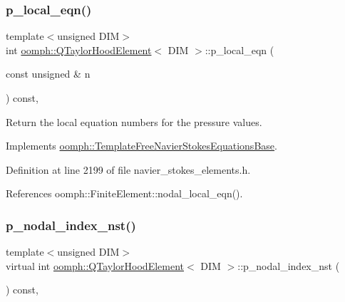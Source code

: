 \mbox{\label{classoomph_1_1QTaylorHoodElement_a13d4dd087330f26ee6283fe63153867d}} 
\subsubsection{\texorpdfstring{p\+\_\+local\+\_\+eqn()}{p\_local\_eqn()}}
{\footnotesize\ttfamily template$<$unsigned D\+IM$>$ \\
int \hyperlink{classoomph_1_1QTaylorHoodElement}{oomph\+::\+Q\+Taylor\+Hood\+Element}$<$ D\+IM $>$\+::p\+\_\+local\+\_\+eqn (\begin{DoxyParamCaption}\item[{const unsigned \&}]{n }\end{DoxyParamCaption}) const\hspace{0.3cm}{\ttfamily [inline]}, {\ttfamily [virtual]}}



Return the local equation numbers for the pressure values. 



Implements \hyperlink{classoomph_1_1TemplateFreeNavierStokesEquationsBase_a4e84f2f4260a0e65201cbb19fd63b398}{oomph\+::\+Template\+Free\+Navier\+Stokes\+Equations\+Base}.



Definition at line 2199 of file navier\+\_\+stokes\+\_\+elements.\+h.



References oomph\+::\+Finite\+Element\+::nodal\+\_\+local\+\_\+eqn().

\mbox{\label{classoomph_1_1QTaylorHoodElement_a86f85131d3383d74ab40dfdb2213d8d5}} 
\subsubsection{\texorpdfstring{p\+\_\+nodal\+\_\+index\+\_\+nst()}{p\_nodal\_index\_nst()}}
{\footnotesize\ttfamily template$<$unsigned D\+IM$>$ \\
virtual int \hyperlink{classoomph_1_1QTaylorHoodElement}{oomph\+::\+Q\+Taylor\+Hood\+Element}$<$ D\+IM $>$\+::p\+\_\+nodal\+\_\+index\+\_\+nst (\begin{DoxyParamCaption}{ }\end{DoxyParamCaption}) const\hspace{0.3cm}{\ttfamily [inline]}, {\ttfamily [virtual]}}



